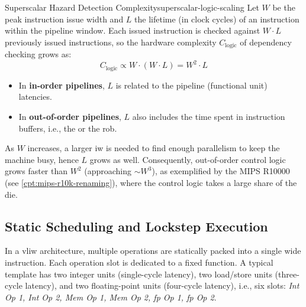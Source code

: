 \begin{observation}{Superscalar Hazard Detection Complexity}{superscalar-logic-scaling}
    Let $W$ be the peak instruction issue width and $L$ the lifetime (in clock cycles) of an instruction within the pipeline window. Each issued instruction is checked against $W \cdot L$ previously issued instructions, so the hardware complexity $C_{\text{logic}}$ of dependency checking grows as:
    \begin{equation}
        C_{\text{logic}} \propto W \cdot (W \cdot L) = W^2 \cdot L
    \end{equation}
    \begin{itemize}
        \item In \textbf{in-order pipelines}, $L$ is related to the pipeline (functional unit) latencies.
        \item In \textbf{out-of-order pipelines}, $L$ also includes the time spent in instruction buffers, i.e., the  or the \gls{rob}.
    \end{itemize}
\end{observation}

As $W$ increases, a larger \gls{iw} is needed to find enough parallelism to keep the machine busy, hence $L$ grows as well. Consequently, out-of-order control logic grows faster than $W^2$ (approaching $\sim W^3$), as exemplified by the MIPS R10000 (see \cref{cpt:mips-r10k-renaming}), where the control logic takes a large share of the die.

\subsection{Static Scheduling and Lockstep Execution}

In a \gls{vliw} architecture, multiple operations are statically packed into a single wide instruction. Each operation slot is dedicated to a fixed function. A typical template has two integer units (single-cycle latency), two load/store units (three-cycle latency), and two floating-point units (four-cycle latency), i.e., six slots: \textit{Int Op 1, Int Op 2, Mem Op 1, Mem Op 2, \gls{fp} Op 1, \gls{fp} Op 2}.

